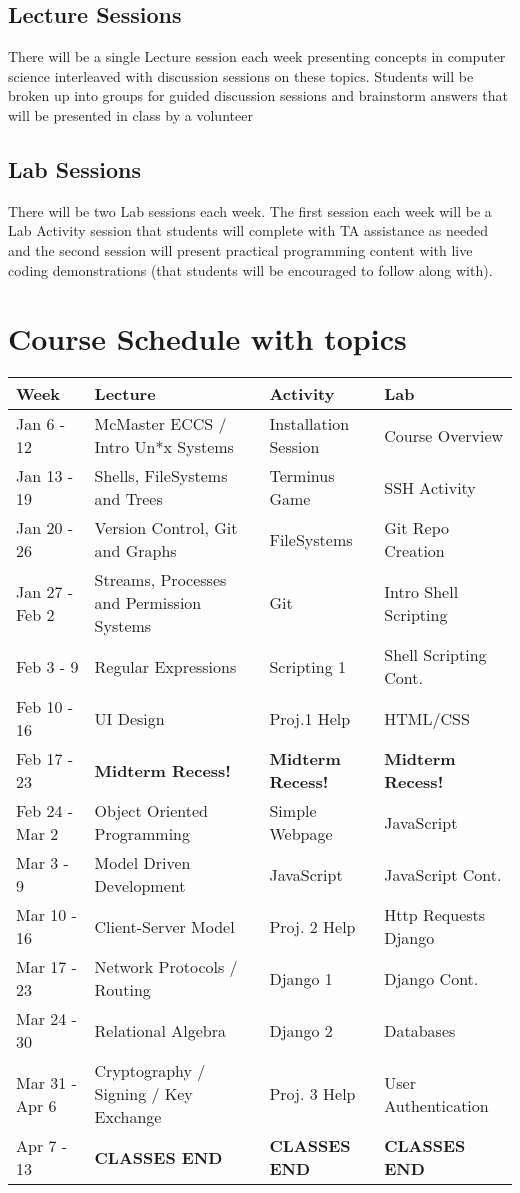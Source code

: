 \documentclass{article}
\begin{document}
\subsection{Lecture Sessions}
\label{sec:org2128252}
There will be a single Lecture session each week presenting concepts in
computer science interleaved with discussion sessions on these topics.
Students will be broken up into groups for guided discussion sessions and
brainstorm answers that will be presented in class by a volunteer
\subsection{Lab Sessions}
\label{sec:org3def4c4}
There will be two Lab sessions each week. The first session each week will be a Lab
Activity session that students will complete with TA assistance as needed and
the second session will present practical programming content with
live coding demonstrations (that students will be encouraged to follow along
with).

\section{Course Schedule with topics}
\label{sec:org7219ea8}
\begin{center}
\begin{tabular}{llll}
Week & Lecture & Activity & Lab\\
\hline
Jan 6 - 12 & McMaster ECCS / Intro Un*x Systems & Installation Session & Course Overview\\
Jan 13 - 19 & Shells, FileSystems and Trees & Terminus Game & SSH Activity\\
Jan 20 - 26 & Version Control, Git and Graphs & FileSystems & Git Repo Creation\\
Jan 27 - Feb 2 & Streams, Processes and Permission Systems & Git & Intro Shell Scripting\\
Feb 3 - 9 & Regular Expressions & Scripting 1 & Shell Scripting Cont.\\
Feb 10 - 16 & UI Design & Proj.1 Help & HTML/CSS\\
Feb 17 - 23 & \textbf{Midterm Recess!} & \textbf{Midterm Recess!} & \textbf{Midterm Recess!}\\
Feb 24 - Mar 2 & Object Oriented Programming & Simple Webpage & JavaScript\\
Mar 3 - 9 & Model Driven Development & JavaScript & JavaScript Cont.\\
Mar 10 - 16 & Client-Server Model & Proj. 2 Help & Http Requests Django\\
Mar 17 - 23 & Network Protocols / Routing & Django 1 & Django Cont.\\
Mar 24 - 30 & Relational Algebra & Django 2 & Databases\\
Mar 31 - Apr 6 & Cryptography / Signing / Key Exchange & Proj. 3 Help & User Authentication\\
Apr 7 - 13 & \textbf{CLASSES END} & \textbf{CLASSES END} & \textbf{CLASSES END}\\
\end{tabular}
\end{center}
\end{document}
